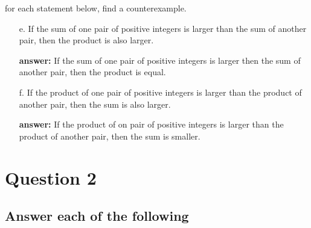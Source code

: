 \documentclass{article}
\begin{document}
for each statement below, find a counterexample.
\begin{itemize}
    \item[e.] If the sum of one pair of positive integers is larger than the sum of another
    pair, then the product is also larger.
    \item[] 
        \textbf{answer:} If the sum of one pair of positive integers is larger then the sum of another 
        pair, then the product is equal.
    \item[f.] If the product of one pair of positive integers is larger than the product of
    another pair, then the sum is also larger.
    \item[]
        \textbf{answer:} If the product of on pair of positive integers is larger than the product of 
        another pair, then the sum is smaller.
\end{itemize}
\section*{Question 2}
\subsection*{\textbf{Answer each of the following} \newline {[10 marks]}}
\end{document}
